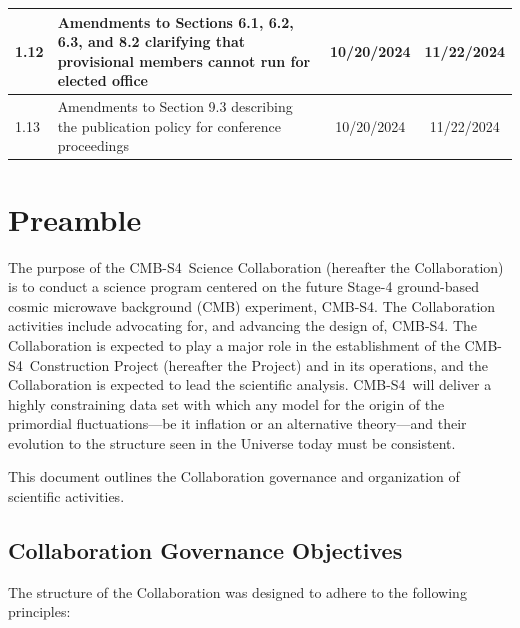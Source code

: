 \documentclass[12pt]{article}
\newcommand{\Comment}[1]{\textcolor{Blue}{(Comment: #1)}}
\newcommand\collabname{CMB-S4}
\begin{document}
\begin{longtable}{| l | p{3.7in} | c | c |}
1.12 & Amendments to Sections 6.1, 6.2, 6.3, and 8.2 clarifying that provisional members cannot run for elected office & 10/20/2024 & 11/22/2024 \label{tab:version} \\ \hline
1.13 & Amendments to Section 9.3 describing the publication policy for conference proceedings & 10/20/2024 & 11/22/2024 \label{tab:version} \\ \hline
\end{longtable}



\newpage

\tableofcontents


\newpage

\section{Preamble}

The purpose of the \collabname\ Science Collaboration (hereafter the Collaboration) is to conduct a science program centered on the future Stage-4 ground-based cosmic microwave background (CMB) experiment, \collabname. The Collaboration activities include advocating for, and advancing the design of, \collabname. The Collaboration is expected to play a major role in the establishment of the \collabname\ Construction Project (hereafter the Project) and in its operations, and the Collaboration is expected to lead the scientific analysis. \collabname\ will deliver a highly constraining data set with which any model for the origin of the primordial fluctuations---be it inflation or an alternative theory---and their evolution to the structure seen in the Universe today must be consistent.

This document outlines the Collaboration governance and organization of scientific activities.

\subsection{Collaboration Governance Objectives}

 The structure of the Collaboration was designed to adhere to the following principles:
\end{document}
